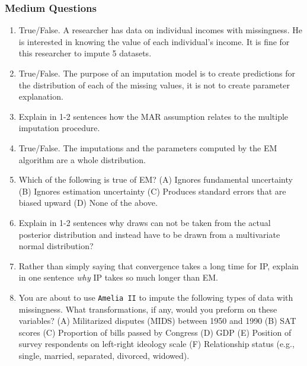 \documentclass[11pt]{article}
\begin{document}
\subsubsection{Medium Questions}
\begin{enumerate}
\item True/False. A researcher has data on individual incomes with missingness. He is interested in knowing the value of each individual's income. It is fine for this researcher to impute 5 datasets. %
\item True/False. The purpose of an imputation model is to create predictions for the distribution of each of the missing values, it is not to create parameter explanation. %
\item Explain in 1-2 sentences how the MAR assumption relates to the multiple imputation procedure.
\item True/False. The imputations and the parameters computed by the EM algorithm are a whole distribution. %
\item Which of the following is true of EM? (A) Ignores fundamental uncertainty (B) Ignores estimation uncertainty (C) Produces standard errors that are biased upward (D) None of the above. %
\item Explain in 1-2 sentences why draws can not be taken from the actual posterior distribution and instead have to be drawn from a multivariate normal distribution?
\item Rather than simply saying that convergence takes a long time for IP, explain in one sentence \emph{why} IP takes so much longer than EM. %
\item You are about to use {\tt Amelia II} to impute the following types of data with missingness. What transformations, if any, would you preform on these variables? (A) Militarized disputes (MIDS) between 1950 and 1990 (B) SAT scores (C) Proportion of bills passed by Congress (D) GDP (E) Position of survey respondents on left-right ideology scale (F) Relationship status (e.g., single, married, separated, divorced, widowed). %

\end{enumerate}
\end{document}
